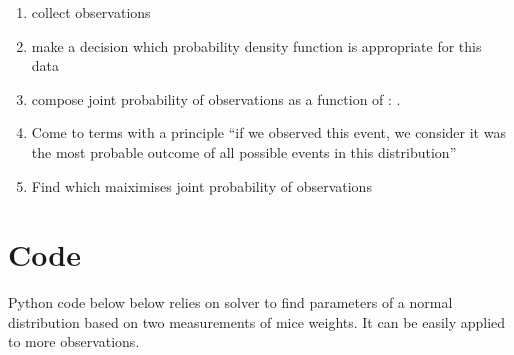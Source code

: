 \documentclass[letterpaper,10pt,english]{sphinxmanual}
\begin{document}
\begin{enumerate}
%
\item {} 
collect observations 

\item {} 
make a decision which probability density function  is appropriate
for this data

\item {} 
compose joint probability of observations as a function of :
.

\item {} 
Come to terms with a principle “if we observed this event, we consider
it was the most probable outcome of all possible events in this distribution”

\item {} 
Find which  maiximises joint probability of observations

\end{enumerate}


\section{Code}
\label{\detokenize{topics/max-likelihood:code}}
Python code below below relies on  solver
to find parameters of a normal distribution based on two measurements
of mice weights. It can be easily applied to more observations.
\end{document}
